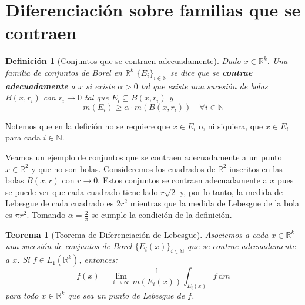 \documentclass[12pt,a4paper]{article}
\theoremstyle{profesional}
\newtheorem{teorema}{Teorema}[section]
\theoremstyle{definicion-style}
\newtheorem{definicion}{Definición}[section]
\newcommand{\R}{\mathbb{R}}
\newcommand{\N}{\mathbb{N}}
\begin{document}
\section{Diferenciación sobre familias que se contraen}

\begin{definicion}[Conjuntos que se contraen adecuadamente]
    Dado \( x \in \R^k \). Una familia de conjuntos de Borel en \( \R^k \) \( {\{ E_i \}}_{i \in \N} \) se dice que se \textbf{contrae adecuadamente} a \( x \)
    si existe \( \alpha > 0 \) tal que existe una sucesión de bolas \( B(x, r_i) \) con \( r_i \to 0 \) tal que \( E_i \subseteq B(x, r_i) \) y \[
        m(E_i) \geq \alpha \cdot m(B(x, r_i)) \quad \forall i \in \N
    \]
\end{definicion}

Notemos que en la defición no se requiere que \( x \in E_i \) o, ni siquiera, que \( x \in \overline{E_i} \) para cada \( i \in \N \).

Veamos un ejemplo de conjuntos que se contraen adecuadamente a un punto \( x \in \R^2 \) y que no son bolas.
Consideremos los cuadrados de \( \R^2 \) inscritos en las bolas \( B(x, r) \) con \( r \to 0 \). Estos conjuntos se contraen adecuadamente a \( x \) pues se puede ver que cada cuadrado tiene lado \( r \sqrt{2} \) y, por lo tanto,
la medida de Lebesgue de cada cuadrado es \( 2 r^2 \) mientras que la medida de Lebesgue de la bola es \( \pi r^2 \). Tomando \( \alpha = \frac{2}{\pi} \) se cumple la condición de la definición.

\begin{teorema}[Teorema de Diferenciación de Lebesgue]
    Asociemos a cada \( x \in \R^k \) una sucesión de conjuntos de Borel \( {\{ E_i(x) \}}_{i \in \N} \) que se contrae adecuadamente a \( x \). Si \( f \in L_1(\R^k) \), entonces:
    \[
        f(x) = \lim_{i \to \infty} \frac{1}{m(E_i(x))} \int_{E_i(x)} f \, \mathrm{d} m
    \]
    para todo \( x \in \R^k \) que sea un punto de Lebesgue de \( f \).
\end{teorema}
\end{document}
